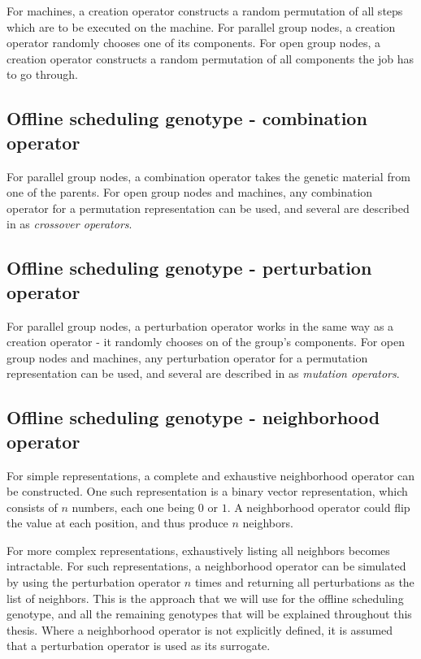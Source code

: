 For machines, a creation operator constructs a random permutation of all steps which are to be executed on the machine. For parallel group nodes, a creation operator randomly chooses one of its components. For open group nodes, a creation operator constructs a random permutation of all components the job has to go through.

\subsection{Offline scheduling genotype - combination operator}
For parallel group nodes, a combination operator takes the genetic material from one of the parents. For open group nodes and machines, any combination operator for a permutation representation can be used, and several are described in \citep{cicirello2023ecta} as \textit{crossover operators}.

\subsection{Offline scheduling genotype - perturbation operator}
For parallel group nodes, a perturbation operator works in the same way as a creation operator - it randomly chooses on of the group's components. For open group nodes and machines, any perturbation operator for a permutation representation can be used, and several are described in \citep{cicirello2023ecta} as \textit{mutation operators}.

\subsection{Offline scheduling genotype - neighborhood operator}
For simple representations, a complete and exhaustive neighborhood operator can be constructed. One such representation is a binary vector representation, which consists of $n$ numbers, each one being $0$ or $1$. A neighborhood operator could flip the value at each position, and thus produce $n$ neighbors.

For more complex representations, exhaustively listing all neighbors becomes intractable. For such representations, a neighborhood operator can be simulated by using the perturbation operator $n$ times and returning all perturbations as the list of neighbors. This is the approach that we will use for the offline scheduling genotype, and all the remaining genotypes that will be explained throughout this thesis. Where a neighborhood operator is not explicitly defined, it is assumed that a perturbation operator is used as its surrogate.

